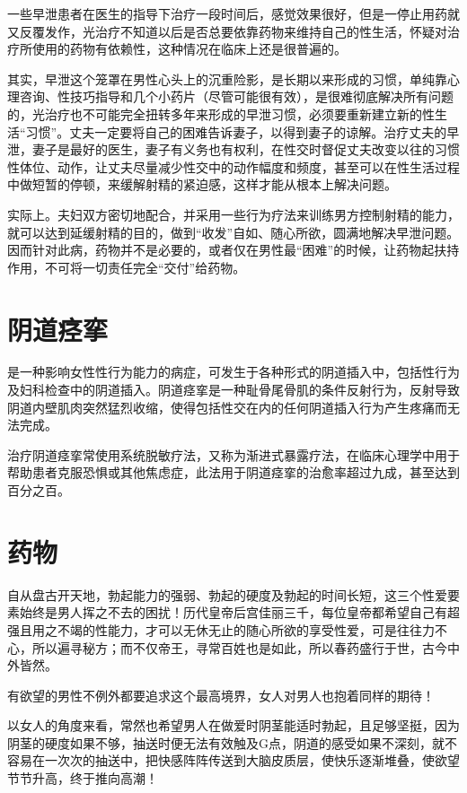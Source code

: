 \documentclass[12pt,UTF8]{ctexbook}
\begin{document}
一些早泄患者在医生的指导下治疗一段时间后，感觉效果很好，但是一停止用药就又反覆发作，光治疗不知道以后是否总要依靠药物来维持自己的性生活，怀疑对治疗所使用的药物有依赖性，这种情况在临床上还是很普遍的。

其实，早泄这个笼罩在男性心头上的沉重险影，是长期以来形成的习惯，单纯靠心理咨询、性技巧指导和几个小药片（尽管可能很有效），是很难彻底解决所有问题的，光治疗也不可能完全扭转多年来形成的早泄习惯，必须要重新建立新的性生活“习惯”。丈夫一定要将自己的困难告诉妻子，以得到妻子的谅解。治疗丈夫的早泄，妻子是最好的医生，妻子有义务也有权利，在性交时督促丈夫改变以往的习惯性体位、动作，让丈夫尽量减少性交中的动作幅度和频度，甚至可以在性生活过程中做短暂的停顿，来缓解射精的紧迫感，这样才能从根本上解决问题。

实际上。夫妇双方密切地配合，并采用一些行为疗法来训练男方控制射精的能力，就可以达到延缓射精的目的，做到“收发”自如、随心所欲，圆满地解决早泄问题。因而针对此病，药物并不是必要的，或者仅在男性最“困难”的时候，让药物起扶持作用，不可将一切责任完全“交付”给药物。

\chapter{阴道痉挛}

是一种影响女性性行为能力的病症，可发生于各种形式的阴道插入中，包括性行为及妇科检查中的阴道插入。阴道痉挛是一种耻骨尾骨肌的条件反射行为，反射导致阴道内壁肌肉突然猛烈收缩，使得包括性交在内的任何阴道插入行为产生疼痛而无法完成。

治疗阴道痉挛常使用系统脱敏疗法，又称为渐进式暴露疗法，在临床心理学中用于帮助患者克服恐惧或其他焦虑症，此法用于阴道痉挛的治愈率超过九成，甚至达到百分之百。

\chapter{药物}

自从盘古开天地，勃起能力的强弱、勃起的硬度及勃起的时间长短，这三个性爱要素始终是男人挥之不去的困扰！历代皇帝后宫佳丽三千，每位皇帝都希望自己有超强且用之不竭的性能力，才可以无休无止的随心所欲的享受性爱，可是往往力不心，所以遍寻秘方；而不仅帝王，寻常百姓也是如此，所以春药盛行于世，古今中外皆然。

有欲望的男性不例外都要追求这个最高境界，女人对男人也抱着同样的期待！

以女人的角度来看，常然也希望男人在做爱时阴茎能适时勃起，且足够坚挺，因为阴茎的硬度如果不够，抽送时便无法有效触及G点，阴道的感受如果不深刻，就不容易在一次次的抽送中，把快感阵阵传送到大脑皮质层，使快乐逐渐堆叠，使欲望节节升高，终于推向高潮！
\end{document}
